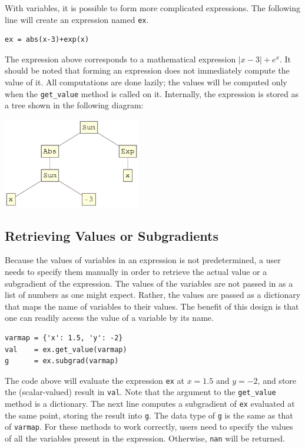 \documentclass[12pt]{article}
\begin{document}
With variables, it is possible to form more complicated expressions. The following line will create an expression named \verb'ex'.
\begin{verbatim}
ex = abs(x-3)+exp(x)
\end{verbatim}
The expression above corresponds to a mathematical expression $|x-3|+e^x$. It should be noted that forming an expression does not immediately compute the value of it. All computations are done lazily; the values will be computed only when the \verb'get_value' method is called on it. Internally, the expression is stored as a tree shown in the following diagram:

\begin{center}
\includegraphics[width=0.45\textwidth]{expr}
\end{center}

\subsection{Retrieving Values or Subgradients}
Because the values of variables in an expression is not predetermined, a user needs to specify them manually in order to retrieve the actual value or a subgradient of the expression. The values of the variables are not passed in as a list of numbers as one might expect. Rather, the values are passed as a dictionary that maps the name of variables to their values. The benefit of this design is that one can readily access the value of a variable by its name.

\begin{verbatim}
varmap = {'x': 1.5, 'y': -2}
val    = ex.get_value(varmap)
g      = ex.subgrad(varmap)
\end{verbatim}

The code above will evaluate the expression \verb'ex' at $x=1.5$ and $y=-2$, and store the (scalar-valued) result in \verb'val'. Note that the argument to the \verb'get_value' method is a dictionary. The next line computes a subgradient of \verb'ex' evaluated at the same point, storing the result into \verb'g'. The data type of \verb'g' is the same as that of \verb'varmap'. For these methods to work correctly, users need to specify the values of all the variables present in the expression. Otherwise, \verb'nan' will be returned.
\end{document}
